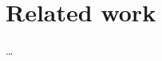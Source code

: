 \chapter{Related work}                                  \label{ch:Related work}

\ldots


\cleardoublepage

